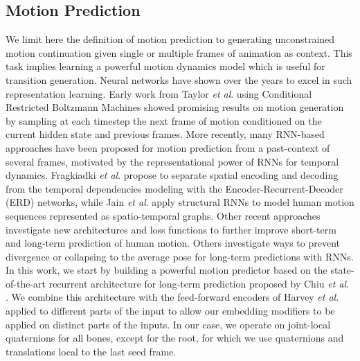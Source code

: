 \documentclass[acmtog]{acmart}
\newcommand{\etal}{\textit{et al}. }
\begin{document}
\subsection{Motion Prediction}
We limit here the definition of motion prediction to generating unconstrained motion continuation given single or multiple frames of animation as context. This task implies learning a powerful motion dynamics model which is useful for transition generation.
Neural networks have shown over the years to excel in such representation learning. Early work from Taylor \etal {} using Conditional Restricted Boltzmann Machines showed promising results on motion generation by sampling at each timestep the next frame of motion conditioned on the current hidden state and  previous frames. More recently, many RNN-based approaches have been proposed for motion prediction from a past-context of several frames, motivated by the representational power of RNNs for temporal dynamics. Fragkiadki \etal {} propose to separate spatial encoding and decoding from the temporal dependencies modeling with the Encoder-Recurrent-Decoder (ERD) networks, while Jain \etal {} apply structural RNNs to model human motion sequences represented as spatio-temporal graphs. 
Other recent approaches \cite{martinez2017human, tang2018long, chiu2019action, gopalakrishnan2019neural, liu2019towards, pavllo2019modeling} investigate new architectures and loss functions to further improve short-term and long-term prediction of human motion. Others \cite{li2017auto, ghosh2017learning} investigate ways to prevent divergence or collapsing to the average pose for long-term predictions with RNNs. In this work, we start by building a powerful motion predictor based on the state-of-the-art recurrent architecture for long-term prediction proposed by Chiu \etal {}.
We combine this architecture with the feed-forward encoders of Harvey \etal {} applied to different parts of the input to allow our embedding modifiers to be applied on distinct parts of the inputs. In our case, we operate on joint-local quaternions for all bones, except for the root, for which we use quaternions and translations local to the last seed frame.  
\end{document}
